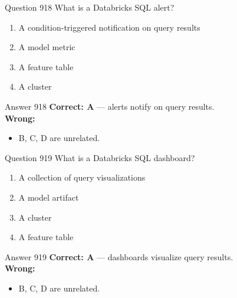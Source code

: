 \documentclass[aspectratio=169,11pt]{beamer}
\begin{document}
	\begin{frame}{Question 918}
		What is a Databricks SQL alert?
		\begin{enumerate}[label=\Alph*.]
			\item A condition-triggered notification on query results
			\item A model metric
			\item A feature table
			\item A cluster
		\end{enumerate}
	\end{frame}
	\begin{frame}{Answer 918}
		\textbf{Correct: A} --- alerts notify on query results.\\
		\vspace{0.5em}
		\textbf{Wrong:}
		\begin{itemize}
			\item B, C, D are unrelated.
		\end{itemize}
	\end{frame}
	
	\begin{frame}{Question 919}
		What is a Databricks SQL dashboard?
		\begin{enumerate}[label=\Alph*.]
			\item A collection of query visualizations
			\item A model artifact
			\item A cluster
			\item A feature table
		\end{enumerate}
	\end{frame}
	\begin{frame}{Answer 919}
		\textbf{Correct: A} --- dashboards visualize query results.\\
		\vspace{0.5em}
		\textbf{Wrong:}
		\begin{itemize}
			\item B, C, D are unrelated.
		\end{itemize}
	\end{frame}
	
\end{document}
